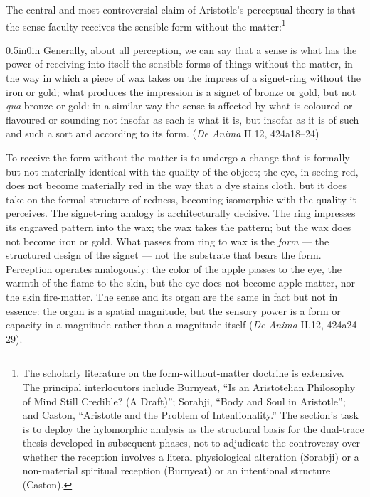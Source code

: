 The central and most controversial claim of Aristotle's perceptual theory is that the sense faculty receives the sensible form without the matter:\footnote{The scholarly literature on the form-without-matter doctrine is extensive. The principal interlocutors include Burnyeat, ``Is an Aristotelian Philosophy of Mind Still Credible? (A Draft)''; Sorabji, ``Body and Soul in Aristotle''; and Caston, ``Aristotle and the Problem of Intentionality.'' The section's task is to deploy the hylomorphic analysis as the structural basis for the dual-trace thesis developed in subsequent phases, not to adjudicate the controversy over whether the reception involves a literal physiological alteration (Sorabji) or a non-material spiritual reception (Burnyeat) or an intentional structure (Caston).}
\begin{adjustwidth}{0.5in}{0in}
Generally, about all perception, we can say that a sense is what has the power of receiving into itself the sensible forms of things without the matter, in the way in which a piece of wax takes on the impress of a signet-ring without the iron or gold; what produces the impression is a signet of bronze or gold, but not \textit{qua} bronze or gold: in a similar way the sense is affected by what is coloured or flavoured or sounding not insofar as each is what it is, but insofar as it is of such and such a sort and according to its form. (\textit{De Anima} II.12, 424a18--24)
\end{adjustwidth}
To receive the form without the matter is to undergo a change that is formally but not materially identical with the quality of the object; the eye, in seeing red, does not become materially red in the way that a dye stains cloth, but it does take on the formal structure of redness, becoming isomorphic with the quality it perceives. The signet-ring analogy is architecturally decisive. The ring impresses its engraved pattern into the wax; the wax takes the pattern; but the wax does not become iron or gold. What passes from ring to wax is the \textit{form} --- the structured design of the signet --- not the substrate that bears the form. Perception operates analogously: the color of the apple passes to the eye, the warmth of the flame to the skin, but the eye does not become apple-matter, nor the skin fire-matter. The sense and its organ are the same in fact but not in essence: the organ is a spatial magnitude, but the sensory power is a form or capacity in a magnitude rather than a magnitude itself (\textit{De Anima} II.12, 424a24--29).

